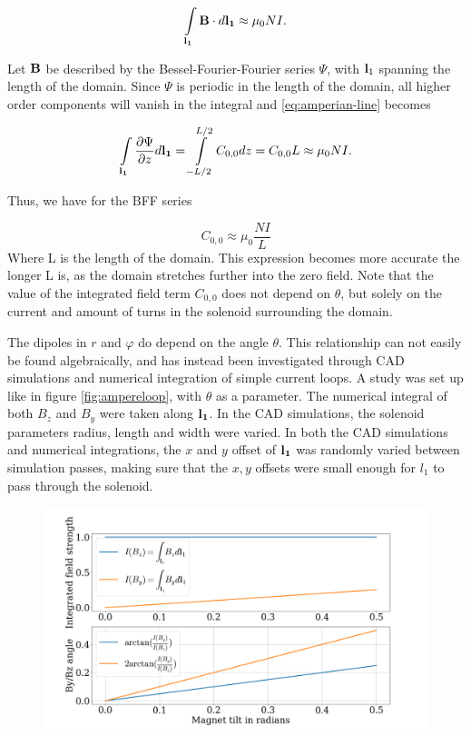 \begin{equation}
    \int \limits_{\vb{l_1}} \vb{B}\cdot d\vb{l_1} \approx \mu_0 NI.
    \label{eq:amperian-line}
\end{equation}

Let $\vb{B}$ be described by the Bessel-Fourier-Fourier series $\Psi$,
with $\vb{l}_1$ spanning the length of the domain. Since $\Psi$ is
periodic in the length of the domain, all higher order components will
vanish in the integral and \ref{eq:amperian-line} becomes

\begin{equation}
    \int \limits_{\vb{l_1}} \frac{\partial\Psi}{\partial z} d\vb{l_1}
    = \int \limits_{-L/2}^{L/2} C_{0,0} dz = C_{0,0} L \approx
    \mu_0 N I.
    \label{eq:Czz}
\end{equation}

Thus, we have for the BFF series

\begin{equation}
    C_{0,0} \approx \mu_0 \frac{NI}{L}
\end{equation}
Where L is the length of the domain. This expression becomes
more accurate the longer L is, as the domain stretches further
into the zero field. Note that the value
of the integrated field term $C_{0,0}$ does not depend on $\theta$,
but solely on the current and amount of turns in the solenoid
surrounding the domain.

The dipoles in $r$ and $\varphi$ do
depend on the angle $\theta$. This relationship can not easily
be found algebraically, and has instead been investigated through CAD simulations
and numerical integration of simple current loops. A study was set up like in figure
\ref{fig:ampereloop}, with $\theta$ as a parameter. The numerical integral of
both $B_z$ and $B_y$ were taken along $\vb{l_1}$. In the CAD simulations, the solenoid
parameters radius, length and width were varied. In both the CAD simulations
and numerical integrations, the $x$ and $y$ offset of $\vb{l_1}$ was randomly varied
between simulation passes, making sure that the $x, y$ offsets were small enough
for $l_1$ to pass through the solenoid.

\begin{figure}[!h]
    \centering
    \includegraphics[width=\linewidth]{figs/dipoleplot}
    \caption{}
    \label{fig:dipoleplot}
\end{figure}

